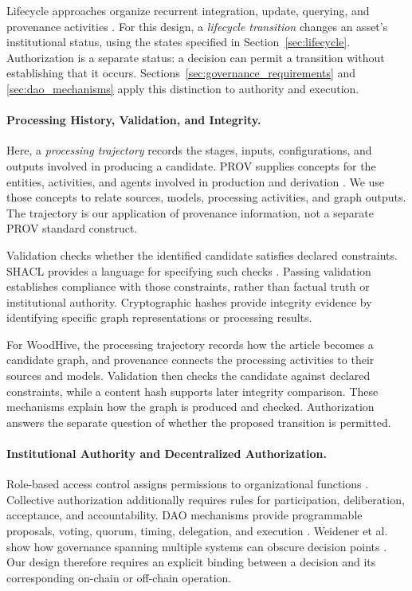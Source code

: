 \documentclass[journal]{IEEEtran}
\begin{document}
Lifecycle approaches organize recurrent integration, update,
querying, and provenance activities \cite{Geisler2025KGLifecycle}.
For this design, a \emph{lifecycle transition} changes an asset's
institutional status, using the states specified in
Section~\ref{sec:lifecycle}. Authorization is a separate
status: a decision can permit a transition without establishing
that it occurs. Sections~\ref{sec:governance_requirements} and
\ref{sec:dao_mechanisms} apply this distinction to authority
and execution.

\paragraph{Processing History, Validation, and Integrity.}

Here, a \emph{processing trajectory} records the stages, inputs,
configurations, and outputs involved in producing a candidate.
PROV supplies concepts for the entities, activities, and agents
involved in production and derivation
\cite{Moreau2013PROV,Lebo2013PROVO}.
We use those concepts to relate sources, models, processing
activities, and graph outputs. The trajectory is our application
of provenance information, not a separate PROV standard construct.

Validation checks whether the identified candidate satisfies
declared constraints. SHACL provides a language for specifying
such checks \cite{Knublauch2017SHACL}.
Passing validation establishes compliance with those constraints,
rather than factual truth or institutional authority.
Cryptographic hashes provide integrity evidence by identifying
specific graph representations or processing results.

For WoodHive, the processing trajectory records how the article becomes
a candidate graph, and provenance connects the processing activities
to their sources and models. Validation then checks the candidate
against declared constraints, while a content hash supports later
integrity comparison. These mechanisms explain how the graph is
produced and checked. Authorization answers the separate question
of whether the proposed transition is permitted.

\paragraph{Institutional Authority and Decentralized Authorization.}

Role-based access control assigns permissions to organizational
functions \cite{Sandhu1996RBAC}. Collective authorization
additionally requires rules for participation, deliberation,
acceptance, and accountability. DAO mechanisms provide
programmable proposals, voting, quorum, timing, delegation,
and execution
\cite{FaqirRhazoui2020DAOOverview,Hassan2021DAO,Han2025DAOReview}.
Weidener et al. show how governance spanning multiple systems
can obscure decision points \cite{Weidener2026Metagovernance}.
Our design therefore requires an explicit binding between a
decision and its corresponding on-chain or off-chain operation.
\end{document}
